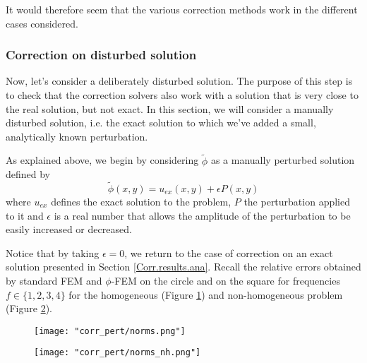 It would therefore seem that the various correction methods work in the different cases considered.

\subsubsection{Correction on disturbed solution} \label{Corr.results.disturbed}
\graphicspath{{images/corr/corr_pert}}

Now, let's consider a deliberately disturbed solution. The purpose of this step is to check that the correction solvers also work with a solution that is very close to the real solution, but not exact. In this section, we will consider a manually disturbed solution, i.e. the exact solution to which we've added a small, analytically known perturbation.

As explained above, we begin by considering $\tilde{\phi}$ as a manually perturbed solution defined by
\begin{equation*}
	\tilde{\phi}(x,y)=u_{ex}(x,y)+\epsilon P(x,y)
\end{equation*}
where $u_{ex}$ defines the exact solution to the problem, $P$ the perturbation applied to it and $\epsilon$ is a real number that allows the amplitude of the perturbation to be easily increased or decreased. 

\begin{Rem}
	Notice that by taking $\epsilon=0$, we return to the case of correction on an exact solution presented in Section \ref{Corr.results.ana}. Recall the relative errors obtained by standard FEM and $\phi$-FEM on the circle and on the square for frequencies $f\in\{1,2,3,4\}$ for the homogeneous  (Figure \ref{norms}) and non-homogeneous problem  (Figure \ref{norms_nh}).
	
	\begin{minipage}{0.48\linewidth}
		\begin{figure}[H]
			\centering
			\texttt{[image: "corr\_pert/norms.png"]}
			\label{norms}
		\end{figure} 
	\end{minipage}
	\begin{minipage}{0.48\linewidth}
		\begin{figure}[H]
			\centering
			\texttt{[image: "corr\_pert/norms\_nh.png"]}
			\label{norms_nh}
		\end{figure} 
	\end{minipage}
\end{Rem}

